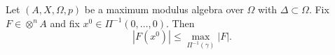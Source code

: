 
Let $(A, X, \Omega, p)$ be a maximum modulus algebra over $\Omega$ with $\Delta \subset \Omega$. Fix $F \in \otimes^n A$ and fix $x^0 \in \Pi^{-1}(0, \ldots, 0)$. Then
$$|F(x^0)| \leq \max_{\Pi^{-1}(\gamma)} |F|.$$
